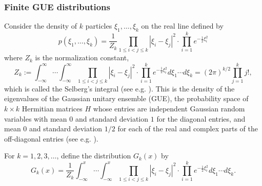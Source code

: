 \documentclass[11pt]{article}
\begin{document}
\subsubsection{Finite GUE distributions}

Consider the density of $k$ particles $\xi_1,\dots, \xi_k$ on the
real line defined by
\begin{equation}
  p(\xi_1,\dots,\xi_k)
  = \frac1{Z_k} \prod_{1\le i<j\le k} |\xi_i-\xi_j|^2
  \cdot \prod_{i=1}^k e^{-\frac12 \xi_i^2}
\end{equation}
where $Z_k$ is the normalization constant,
\begin{equation}
  Z_k := \int_{-\infty}^\infty \cdots \int_{-\infty}^\infty
  \prod_{1\le i<j\le k} |\xi_i-\xi_j|^2
  \cdot \prod_{i=1}^k e^{-\frac12 \xi_i^2}
  d\xi_1\cdots d\xi_k
  = (2\pi)^{k/2} \prod_{j=1}^k j!,
\end{equation}
which is called the Selberg's integral (see e.g. \cite{Mehta}).
This is the density of the eigenvalues of the Gaussian unitary
ensemble (GUE), the probability space of $k\times k$ Hermitian
matrices $H$ whose entries are independent Gaussian random
variables with mean $0$ and standard deviation $1$ for the
diagonal entries, and mean $0$ and standard deviation $1/2$ for
each of the real and complex parts of the off-diagonal entries
(see e.g. \cite{Mehta}).

\begin{definition}
For $k=1,2,3,\dots$, define the distribution $G_k(x)$ by
\begin{equation}\label{eq:Gkdef}
  G_k(x) = \frac1{Z_k}  \int_{-\infty}^x\cdots \int_{-\infty}^x
  \prod_{1\le i<j\le k} |\xi_i-\xi_j|^2
  \cdot \prod_{i=1}^k e^{-\frac12 \xi_i^2}
  d\xi_1\cdots d\xi_k .
\end{equation}
\end{definition}
\end{document}

